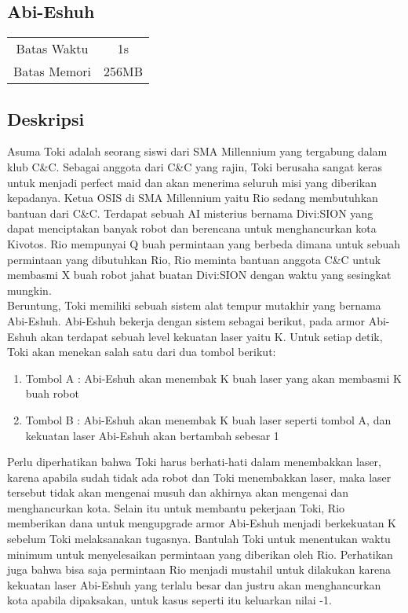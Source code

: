 \documentclass{article}
\begin{document}
\begin{center}

    
    \section*{Abi-Eshuh} %

    \begin{tabular}{ | c c | }
        \hline
        Batas Waktu  & 1s \\    %
        Batas Memori & 256MB \\  %
        \hline
    \end{tabular}
\end{center}

\subsection*{Deskripsi}

Asuma Toki adalah seorang siswi dari SMA Millennium yang tergabung dalam klub C\&C. Sebagai anggota dari C\&C yang rajin, Toki berusaha sangat keras untuk menjadi perfect maid dan akan menerima seluruh misi yang diberikan kepadanya. Ketua OSIS di SMA Millennium yaitu Rio sedang membutuhkan bantuan dari C\&C. Terdapat sebuah AI misterius bernama Divi:SION yang dapat menciptakan banyak robot dan berencana untuk menghancurkan kota Kivotos. Rio mempunyai Q buah permintaan yang berbeda dimana untuk sebuah permintaan yang dibutuhkan Rio, Rio meminta bantuan anggota C\&C untuk membasmi X buah robot jahat buatan Divi:SION dengan waktu yang sesingkat mungkin.\\

Beruntung, Toki memiliki sebuah sistem alat tempur mutakhir yang bernama Abi-Eshuh. Abi-Eshuh bekerja dengan sistem sebagai berikut, pada armor Abi-Eshuh akan terdapat sebuah level kekuatan laser yaitu K. Untuk setiap detik, Toki akan menekan salah satu dari dua tombol berikut:
\begin{enumerate}
    \item Tombol A : Abi-Eshuh akan menembak K buah laser yang akan membasmi K buah robot 
    \item Tombol B : Abi-Eshuh akan menembak K buah laser seperti tombol A, dan kekuatan laser Abi-Eshuh akan bertambah sebesar 1
\end{enumerate}
Perlu diperhatikan bahwa Toki harus berhati-hati dalam menembakkan laser, karena apabila sudah tidak ada robot dan Toki menembakkan laser, maka laser tersebut tidak akan mengenai musuh dan akhirnya akan mengenai dan menghancurkan kota. Selain itu untuk membantu pekerjaan Toki, Rio memberikan dana untuk mengupgrade armor Abi-Eshuh menjadi berkekuatan K sebelum Toki melaksanakan tugasnya. Bantulah Toki untuk menentukan waktu minimum untuk menyelesaikan permintaan yang diberikan oleh Rio. Perhatikan juga bahwa bisa saja permintaan Rio menjadi mustahil untuk dilakukan karena kekuatan laser Abi-Eshuh yang terlalu besar dan justru akan menghancurkan kota apabila dipaksakan, untuk kasus seperti itu keluarkan nilai -1.
\end{document}
